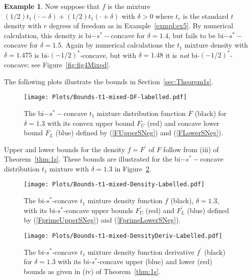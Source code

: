 \documentclass[11pt]{amsart}
\numberwithin{equation}{section}
\theoremstyle{definition}\newtheorem{definition}{Definition}
\theoremstyle{remark}\newtheorem{assumption}{Assumption}
\theoremstyle{remark}\newtheorem{remark}{Remark}
\theoremstyle{definition}\newtheorem{example}{Example}
\theoremstyle{plain}\newtheorem{question}{Question}
\theoremstyle{plain}\newtheorem{theorem}{Theorem}
\theoremstyle{plain}\newtheorem{lemma}{Lemma}
\theoremstyle{plain}\newtheorem{proposition}{Proposition}
\theoremstyle{plain}\newtheorem{corollary}{Corollary}
\theoremstyle{plain}\newtheorem{conjecture}{Conjecture}
\begin{document}
\begin{example}
\label{exmpl:5s}
Now suppose that $f$ is the mixture $(1/2) t_1 (\cdot - \delta) + (1/2) t_1 (\cdot + \delta ) $ with $\delta >0$ 
where $t_r$ is the standard $t$ density with $r$ degrees of freedom as in Example~\ref{exmpl:ex5}.  
By numerical calculation, this density is bi$-s^*-$concave for $\delta = 1.4$, but fails to be bi$-s^*-$concave for $\delta = 1.5$.
Again by numerical calculations the $t_1$ mixture density with  $\delta =1.475 $ is bi-$(-1/2)^*$-concave, 
but with $\delta =1.48$ it is {\sl not} bi-$(-1/2)^*$-concave;  see Figure~\ref{fig:fig4Mixed}.

\end{example}
The following plots illustrate the bounds in Section~\ref{sec:Theorem1s}.

\begin{figure}[ht]
    \centering
    \texttt{[image: Plots/Bounds-t1-mixed-DF-labelled.pdf]}
    \caption{The bi$-s^*-$concave $t_1$ mixture distribution function $F$ (black) for $\delta = 1.3$
    with its convex upper bound $F_U$ (red) and concave lower bound $F_L$ (blue) defined by (\ref{FUpperSNeg}) and (\ref{FLowerSNeg}).}
     \label{fig:fig1Mixed}
 \end{figure}
Upper and lower bounds for the density $f = F^{\prime} $ of $F$ follow from (iii)  of Theorem~\ref{thm:1s}.
These bounds are illustrated for the bi$-s^*-$concave distribution $t_1$ mixture with $\delta = 1.3$ 
in Figure~\ref{fig:fig2Mixed}.
 
 \begin{figure}[ht]
    \centering
    \texttt{[image: Plots/Bounds-t1-mixed-Density-Labelled.pdf]} 
    \caption{The bi-$s^*$-concave $t_1$ mixture density function $f$ (black), $\delta = 1.3$, 
    with its bi-$s^*$-concave upper bounds 
    $F_U^{\prime}$ (red) and $F_L^{\prime}$ (blue) defined by (\ref{FprimeUpperSNeg}) and (\ref{FprimeLowerSNeg}).}
     \label{fig:fig2Mixed}
 \end{figure}

\begin{figure}[ht]
    \centering
    \texttt{[image: Plots/Bounds-t1-mixed-DensityDeriv-Labelled.pdf]} 
    \caption{The bi-$s^*$-concave $t_1$ mixture density function derivative $f^{\prime}$ (black) for $\delta = 1.3$ with its bi-$s^*$-concave 
     upper (blue) and lower (red) bounds as given in (iv) of Theorem~\ref{thm:1s}.}
     \label{fig:fig3Mixed}
 \end{figure}
 
\end{document}
